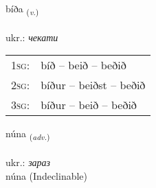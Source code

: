 \documentclass[frontgrid, backgrid]{flacards}\usepackage[]{graphicx}\usepackage[]{xcolor}
\begin{document}
\renewcommand{\flhead}{\vskip5pt \fboxsep=0pt {\small\bfseries\footnotesize Sagnorð | дієслово}}
\renewcommand{\fcfoot}{\vskip5pt \fboxsep=0pt \hspace{2pt}{\small\bfseries\footnotesize 1K}}

\renewcommand{\blhead}{\vskip5pt {\small\bfseries\footnotesize Sagnorð | дієслово }}
\renewcommand{\bcfoot}{\vskip5pt \hspace{2pt}{\small\bfseries\footnotesize 1K}}


{bíða \small{\textsubscript{(\textit{v.})}} \\[1ex] %
\textphonetic{[piːða]} \\
ukr.: \emph{чекати} \\  [2ex]
\renewcommand*{\arraystretch}{0.8}
\begin{tabular}{p{1cm}l}
\textsc{1sg}: & bíð -- beið -- beðið \\ 
\textsc{2sg}: & bíður -- beiðst -- beðið \\ 
\textsc{3sg}: & bíður -- beið -- beðið \\ 
\end{tabular}
}


\renewcommand{\flhead}{\vskip5pt \fboxsep=0pt {\small\bfseries\footnotesize Atviksorð | прислівник}}
\renewcommand{\fcfoot}{\vskip5pt \fboxsep=0pt \hspace{2pt}{\small\bfseries\footnotesize 1K}}

\renewcommand{\blhead}{\vskip5pt {\small\bfseries\footnotesize Atviksorð | прислівник }}
\renewcommand{\bcfoot}{\vskip5pt \hspace{2pt}{\small\bfseries\footnotesize 1K}}


{núna \small{\textsubscript{(\textit{adv.})}} \\[1ex]
\textphonetic{[nuːna]} \\
ukr.: \emph{зараз} \\  [2ex]
núna (Indeclinable)}

\renewcommand{\flhead}{\vskip5pt \fboxsep=0pt {\small\bfseries\footnotesize Sagnorð | дієслово}}
\renewcommand{\fcfoot}{\vskip5pt \fboxsep=0pt \hspace{2pt}{\small\bfseries\footnotesize 1K}}
\end{document}
